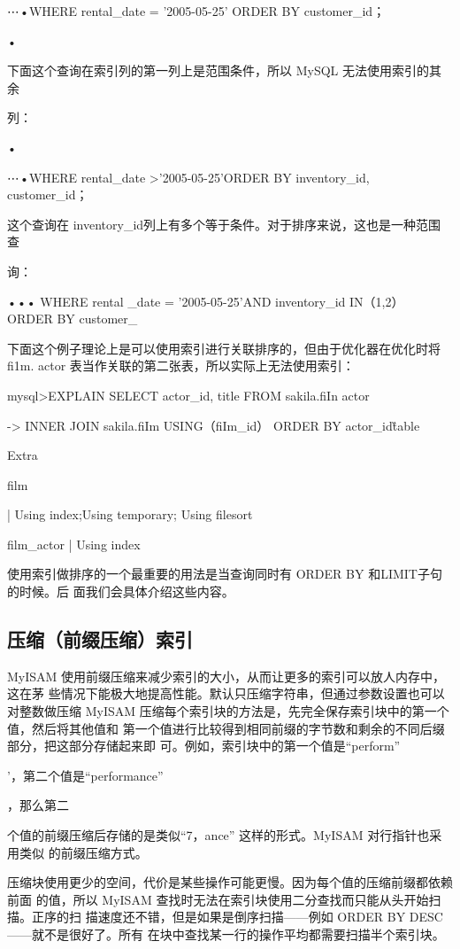 ⋯•WHERE rental\_date = '2005-05-25' ORDER BY customer\_id；

•

下面这个查询在索引列的第一列上是范围条件，所以 MySQL 无法使用索引的其余

列：

•

⋯•WHERE rental\_date >'2005-05-25'ORDER BY inventory\_id, customer\_id；

这个查询在 inventory\_id列上有多个等于条件。对于排序来说，这也是一种范围查

询：

••• WHERE rental \_date = '2005-05-25'AND inventory\_id IN（1,2） ORDER BY customer\_

下面这个例子理论上是可以使用索引进行关联排序的，但由于优化器在优化时将fi1m.
actor 表当作关联的第二张表，所以实际上无法使用索引：

mysql>EXPLAIN SELECT actor\_id, title FROM sakila.fiIn actor

-> INNER JOIN sakila.fiIm USING（fiIm\_id） ORDER BY actor\_id\G

table

Extra

film

| Using index;Using temporary; Using filesort

film\_actor | Using index

使用索引做排序的一个最重要的用法是当查询同时有 ORDER BY 和LIMIT子句的时候。后
面我们会具体介绍这些内容。

\subsection{压缩（前缀压缩）索引}
MyISAM 使用前缀压缩来减少索引的大小，从而让更多的索引可以放人内存中，这在茅
些情况下能极大地提高性能。默认只压缩字符串，但通过参数设置也可以对整数做压缩
MyISAM 压缩每个索引块的方法是，先完全保存索引块中的第一个值，然后将其他值和
第一个值进行比较得到相同前缀的字节数和剩余的不同后缀部分，把这部分存储起来即
可。例如，索引块中的第一个值是“perform”

’，第二个值是“performance”

，那么第二

个值的前缀压缩后存储的是类似“7，ance” 这样的形式。MyISAM 对行指针也采用类似
的前缀压缩方式。

压缩块使用更少的空间，代价是某些操作可能更慢。因为每个值的压缩前缀都依赖前面
的值，所以 MyISAM 查找时无法在索引块使用二分查找而只能从头开始扫描。正序的扫
描速度还不错，但是如果是倒序扫描——例如 ORDER BY DESC——就不是很好了。所有
在块中查找某一行的操作平均都需要扫描半个索引块。

